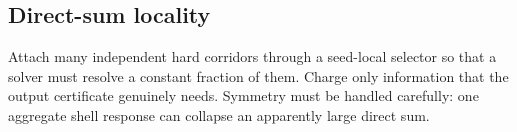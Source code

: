 \subsection{Direct-sum locality}

Attach many independent hard corridors through a seed-local selector so that a
solver must resolve a constant fraction of them.  Charge only information that
the output certificate genuinely needs.  Symmetry must be handled carefully:
one aggregate shell response can collapse an apparently large direct sum.
